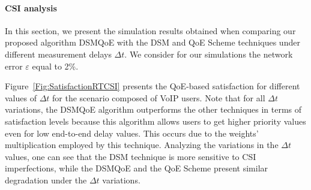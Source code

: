 \documentclass[conference]{IEEEtran}
\newcommand{\FigRef}[1]{Figure~\ref{#1}}
\begin{document}
%
%
%

\paragraph{\ac{CSI} analysis}
In this section, we present the simulation results obtained when comparing our proposed algorithm DSMQoE with the \ac{DSM} and \ac{QoE} Scheme techniques under different measurement delays $\Delta t$. We consider for our simulations the network error $\varepsilon$ equal to 2\%.

\FigRef{Fig:SatisfactionRTCSI} presents the \ac{QoE}-based satisfaction for different values of $\Delta t$ for the scenario composed of VoIP users. Note that for all $\Delta t$ variations, the DSMQoE algorithm outperforms the other techniques in terms of satisfaction levels because this algorithm allows users to get higher priority values even for low end-to-end delay values. This occurs due to the weights' multiplication employed by this technique. Analyzing the variations in the $\Delta t$ values, one can see that the DSM technique is more sensitive to CSI imperfections, while the DSMQoE and the QoE Scheme present similar degradation under the $\Delta t$ variations.
\end{document}
